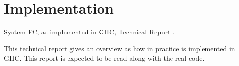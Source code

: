 \section{Implementation}

System FC, as implemented in GHC, Technical Report \citep{eisenberg2015system}.

This technical report gives an overview as how in practice \FC is implemented in
GHC. This report is expected to be read along with the real code.



